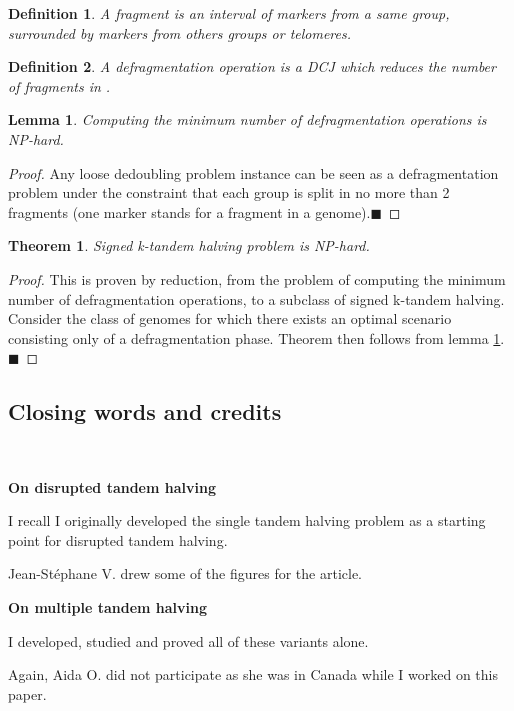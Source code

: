 \documentclass[11pt,final,twoside,nofrench]{thlifl}
\newcommand{\qed}{\ensuremath{\blacksquare}}
\newtheorem{proof}{Proof}
\newtheorem{theorem}{Theorem}
\newtheorem{lemma}{Lemma}
\newtheorem{definition}{Definition}
\begin{document}
{\begin{definition}
A \emph{fragment} is an interval of markers from a same group, surrounded by markers from others groups \emph{or telomeres}.
\end{definition}

\begin{definition}
A \emph{defragmentation operation} is a DCJ which reduces the number of fragments in .
\end{definition}

\begin{lemma}
\label{lem:defrag}
Computing the minimum number of defragmentation operations is NP-hard.
\end{lemma}
\begin{proof}
Any loose dedoubling problem instance can be seen as a defragmentation problem under the constraint that each group is split in no more than 2 fragments (one marker stands for a fragment in a genome).\qed 

\end{proof}

\begin{theorem}
Signed k-tandem halving problem is NP-hard.
\end{theorem}

\begin{proof}
This is proven by reduction, from the problem of computing the minimum number of defragmentation operations, to a subclass of signed k-tandem halving.
Consider the class of genomes for which there exists an optimal scenario consisting only of a defragmentation phase. Theorem then follows from lemma \ref{lem:defrag}.\qed
\end{proof}

\subsection{Closing words and credits}

~

\textbf{On disrupted tandem halving}

I recall I originally developed the single tandem halving problem as a starting point for disrupted tandem halving.

Jean-Stéphane V. drew some of the figures for the article.

\textbf{On multiple tandem halving}

I developed, studied and proved all of these variants alone.

Again, Aida O. did not participate as she was in Canada while I worked on this paper.

}
\end{document}
